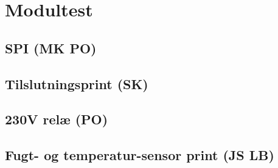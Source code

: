 \chapter{Modultest}

\section{SPI (MK PO)}


\section{Tilslutningsprint (SK)}


\section{230V relæ (PO)}


\section{Fugt- og temperatur-sensor print (JS LB)}

